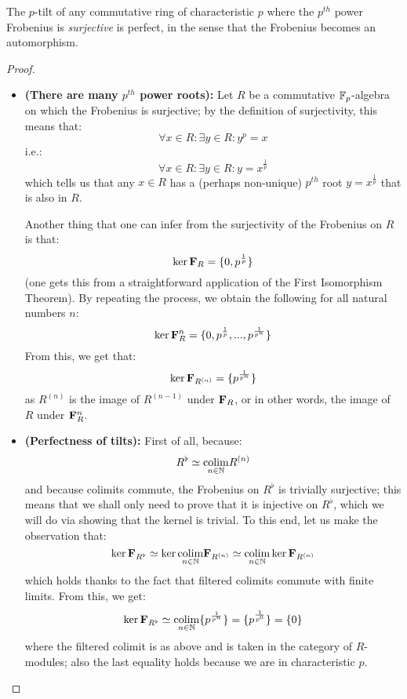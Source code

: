                 \begin{lemma} \label{lemma: tilts_are_perfect}
                    The $p$-tilt of any commutative ring of characteristic $p$ where the $p^{th}$ power Frobenius is \textit{surjective} is perfect, in the sense that the Frobenius becomes an automorphism. 
                \end{lemma}
                    \begin{proof}
                        \noindent
                        \begin{itemize}
                            \item \textbf{(There are many $p^{th}$ power roots):} Let $R$ be a commutative $\mathbb{F}_p$-algebra on which the Frobenius is surjective; by the definition of surjectivity, this means that:
                                $$\forall x \in R: \exists y \in R: y^p = x$$
                            i.e.:
                                $$\forall x \in R: \exists y \in R: y = x^{\frac1p}$$
                            which tells us that any $x \in R$ has a (perhaps non-unique) $p^{th}$ root $y = x^{\frac1p}$ that is also in $R$.
                            
                            Another thing that one can infer from the surjectivity of the Frobenius on $R$ is that:
                                $$\ker \mathbf{F}_R = \{0, p^{\frac1p}\}$$
                            (one gets this from a straightforward application of the First Isomorphism Theorem). By repeating the process, we obtain the following for all natural numbers $n$:
                                $$\ker \mathbf{F}_R^n = \{0, p^{\frac1p}, ..., p^{\frac{1}{p^n}}\}$$
                            From this, we get that:
                                $$\ker \mathbf{F}_{R^{(n)}} = \{p^{\frac{1}{p^n}}\}$$
                            as $R^{(n)}$ is the image of $R^{(n - 1)}$ under $\mathbf{F}_R$, or in other words, the image of $R$ under $\mathbf{F}_R^n$.
                            \item \textbf{(Perfectness of tilts):} First of all, because:
                                $$R^{\flat} \simeq \underset{n \in \mathbb{N}}{\operatorname{colim}} R^{(n)}$$
                            and because colimits commute, the Frobenius on $R^{\flat}$ is trivially surjective; this means that we shall only need to prove that it is injective on $R^{\flat}$, which we will do via showing that the kernel is trivial. To this end, let us make the observation that:
                                $$\ker \mathbf{F}_{R^{\flat}} \simeq \ker \underset{n \in \mathbb{N}}{\operatorname{colim}} \mathbf{F}_{R^{(n)}} \simeq \underset{n \in \mathbb{N}}{\operatorname{colim}} \ker \mathbf{F}_{R^{(n)}}$$
                            which holds thanks to the fact that filtered colimits commute with finite limits. From this, we get:
                                $$\ker \mathbf{F}_{R^{\flat}} \simeq \underset{n \in \mathbb{N}}{\operatorname{colim}} \{p^{\frac{1}{p^n}}\} = \{p^{\frac{1}{p^0}}\} = \{0\}$$
                            where the filtered colimit is as above and is taken in the category of $R$-modules; also the last equality holds because we are in characteristic $p$.
                        \end{itemize}
                    \end{proof}
                
